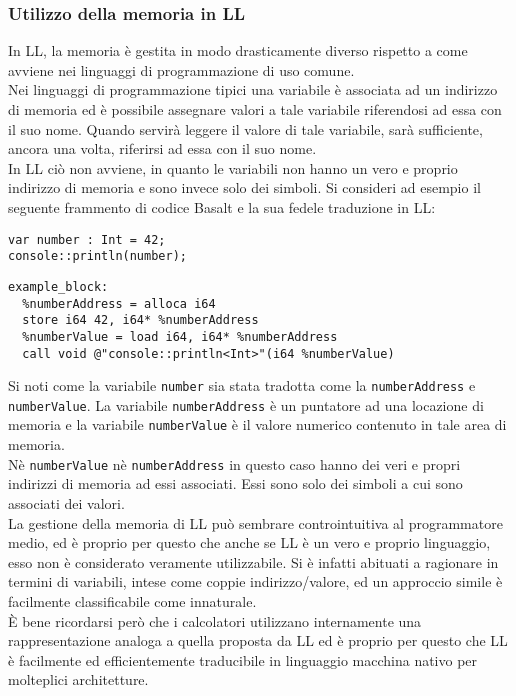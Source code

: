 \subsubsection{Utilizzo della memoria in LL}
In LL, la memoria è gestita in modo drasticamente diverso rispetto 
a come avviene nei linguaggi di programmazione di uso comune. \\ 

Nei linguaggi di programmazione tipici una variabile è associata ad un indirizzo 
di memoria ed è possibile assegnare valori a tale variabile riferendosi ad essa con il suo nome. Quando 
servirà leggere il valore di tale variabile, sarà sufficiente, ancora una volta, riferirsi ad essa 
con il suo nome. \\

In LL ciò non avviene, in quanto le variabili non hanno un vero e proprio indirizzo di memoria 
e sono invece solo dei simboli. Si consideri ad esempio il seguente frammento di codice Basalt 
e la sua fedele traduzione in LL:

\vspace{0.5cm}
\begin{lstlisting}[frame=single]
var number : Int = 42;
console::println(number);
\end{lstlisting}

\begin{lstlisting}[frame=single]
example_block:
  %numberAddress = alloca i64
  store i64 42, i64* %numberAddress
  %numberValue = load i64, i64* %numberAddress
  call void @"console::println<Int>"(i64 %numberValue)
\end{lstlisting}
\vspace{0.5cm}

Si noti come la variabile \texttt{number} sia stata tradotta come la \texttt{numberAddress} e \texttt{numberValue}.
La variabile \texttt{numberAddress} è un puntatore ad una locazione di memoria e la variabile \texttt{numberValue}
è il valore numerico contenuto in tale area di memoria. \\

Nè \texttt{numberValue} nè \texttt{numberAddress} in 
questo caso hanno dei veri e propri indirizzi di memoria ad essi associati. 
Essi sono solo dei simboli a cui sono associati dei valori. \\

La gestione della memoria di LL può sembrare controintuitiva al programmatore medio, ed è proprio per questo 
che anche se LL è un vero e proprio linguaggio, esso non è considerato veramente utilizzabile. Si è infatti abituati
a ragionare in termini di variabili, intese come coppie indirizzo/valore, ed un approccio simile è facilmente 
classificabile come innaturale. \\

È bene ricordarsi però che i calcolatori utilizzano internamente una rappresentazione 
analoga a quella proposta da LL ed è proprio per questo che LL è facilmente ed efficientemente traducibile 
in linguaggio macchina nativo per molteplici architetture. \\